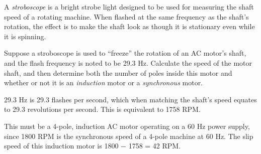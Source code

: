 

A {\it stroboscope} is a bright strobe light designed to be used for measuring the shaft speed of a rotating machine.  When flashed at the same frequency as the shaft's rotation, the effect is to make the shaft look as though it is stationary even while it is spinning.

\vskip 10pt

Suppose a stroboscope is used to ``freeze'' the rotation of an AC motor's shaft, and the flash frequency is noted to be 29.3 Hz.  Calculate the speed of the motor shaft, and then determine both the number of poles inside this motor and whether or not it is an {\it induction} motor or a {\it synchronous} motor.







29.3 Hz is 29.3 flashes per second, which when matching the shaft's speed equates to 29.3 revolutions per second.  This is equivalent to 1758 RPM.
 
\vskip 10pt

This must be a 4-pole, induction AC motor operating on a 60 Hz power supply, since 1800 RPM is the synchronous speed of a 4-pole machine at 60 Hz.  The slip speed of this induction motor is 1800 $-$ 1758 = 42 RPM.











